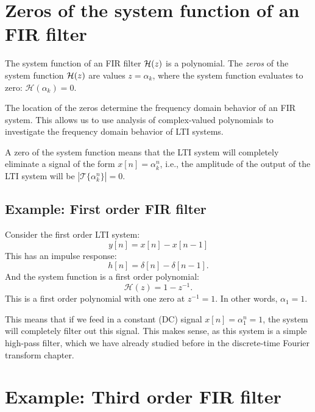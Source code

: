 \section{Zeros of the system function of an FIR filter}
The system function of an FIR filter $\mathcal{H}(z)$ is a polynomial. The
\emph{zeros} of the system function $\mathcal{H}(z)$ are values $z=\alpha_k$, where
the system function evaluates to zero: $\mathcal{H}(\alpha_k) = 0$.

The location of the zeros determine the frequency domain behavior of
an FIR system. This allows us to use analysis of complex-valued polynomials
to investigate the frequency domain behavior of LTI systems.

A zero of the system function means that the LTI system will
completely eliminate a signal of the form $x[n]=\alpha_k^{n}$, i.e.,
the amplitude of the output of the LTI system will be
$|\mathcal{T}\{\alpha_k^{n}\}|=0$.

\subsection{Example: First order FIR filter}

Consider the first order LTI system:
\begin{equation}
  y[n] = x[n] - x[n-1]
\end{equation}
This has an impulse response:
\begin{equation}
  h[n] = \delta[n] - \delta[n-1].
\end{equation}
And the system function is a first order polynomial:
\begin{equation}
  \mathcal{H}(z) = 1-z^{-1}.
\end{equation}
This is a first order polynomial with one zero at $z^{-1}=1$. In other
words, $\alpha_1=1$.

This means that if we feed in a constant (DC) signal $x[n]=\alpha_1^{n}=1$, the
system will completely filter out this signal. This makes sense, as
this system is a simple high-pass filter, which we have already
studied before in the discrete-time Fourier transform chapter.

\section{Example: Third order FIR filter}

